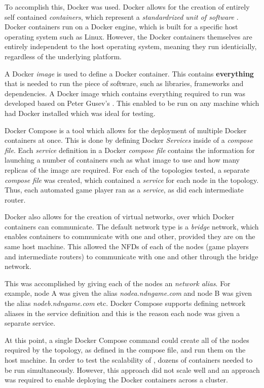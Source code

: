 To accomplish this, Docker was used. Docker allows for the creation of entirely self contained \textit{containers}, which represent a \textit{standardrized unit of software} \cite{docker}. Docker containers run on a Docker engine, which is built for a specific host operating system such as Linux. However, the Docker containers themselves are entirely independent to the host operating system, meaning they run identicially, regardless of the underlying platform.

A Docker \textit{image} is used to define a Docker container. This contains \textbf{everything} that is needed to run the piece of software, such as libraries, frameworks and dependencies. A Docker image which contains everything required to run \game{} was developed based on Peter Gusev's \cite{docker-ndn}. This enabled \game{} to be run on any machine which had Docker installed which was ideal for testing.

Docker Compose \cite{docker-compose} is a tool which allows for the deployment of multiple Docker containers at once. This is done by defining Docker \textit{Services} inside of a \textit{compose file}. Each \textit{service} definition in a Docker \textit{compose file} contains the information for launching a number of containers such as what image to use and how many replicas of the image are required. For each of the topologies tested, a separate \textit{compose file} was created, which contained a \textit{service} for each node in the topology. Thus, each automated game player ran as a \textit{service}, as did each intermediate router.

Docker also allows for the creation of virtual networks, over which Docker containers can communicate. The default network type is a \textit{bridge} network, which enables containers to communicate with one and other, provided they are on the same host machine. This allowed the NFDs of each of the nodes (game players and intermediate routers) to communicate with one and other through the bridge network. 

This was accomplished by giving each of the nodes an \textit{network alias}. For example, node A was given the alias \textit{nodea.ndngame.com} and node B was given the alias \textit{nodeb.ndngame.com} etc. Docker Compose supports defining network aliases in the service definition and this is the reason each node was given a separate service.

At this point, a single Docker Compose command could create all of the \game{} nodes required by the topology, as defined in the compose file, and run them on the host machine. In order to test the scalability of \game{}, dozens of containers needed to be run simultaneously. However, this approach did not scale well and an approach was required to enable deploying the Docker containers across a cluster.

